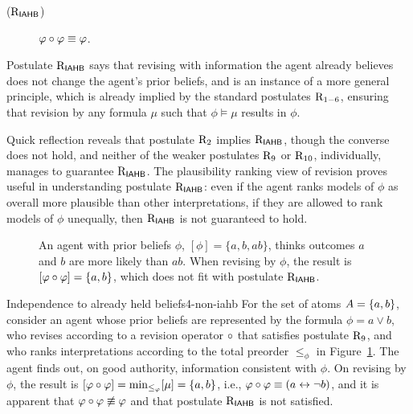 \begin{description}
	\item[($\mathrm{R}_{\mathsf{IAHB}}$)] $\varphi\circ\varphi\equiv\varphi$.
\end{description}

Postulate $\mathrm{R}_{\mathsf{IAHB}}$
says that revising with information the agent already believes
does not change the agent's prior beliefs,
and is an instance of a more general principle, 
which is already implied by the standard postulates $\mathrm{R}_{1-6}$,
ensuring that revision by any formula $\mu$ such that $\phi\models\mu$
results in $\phi$.

Quick reflection reveals that postulate $\mathrm{R}_{2}$ implies $\mathrm{R}_{\mathsf{IAHB}}$, 
though the converse does not hold,
and neither of the weaker postulates $\mathrm{R}_{9}$ or $\mathrm{R}_{10}$, individually,
manages to guarantee $\mathrm{R}_{\mathsf{IAHB}}$.
The plausibility ranking view of revision proves useful in understanding postulate $\mathrm{R}_{\mathsf{IAHB}}$:
even if the agent ranks models of $\phi$ as overall more plausible than other interpretations,
if they are allowed to rank models of $\phi$ unequally, then $\mathrm{R}_{\mathsf{IAHB}}$ is not guaranteed to hold.

\begin{figure}\centering
	\caption{
		An agent with prior beliefs $\phi$, $[\phi]=\{a,b,ab\}$, 
		thinks outcomes $a$ and $b$ are more likely than $ab$.
		When revising by $\phi$, the result is $[\varphi\circ\varphi]=\{a,b\}$,
		which does not fit with postulate $\mathrm{R}_{\mathsf{IAHB}}$.
	}
	\label{fig:4-non-stability}
\end{figure}

\begin{xmpl}{Independence to already held beliefs}{4-non-iahb}
	For the set of atoms $A=\{a,b\}$,
	consider an agent whose prior beliefs are represented by the formula $\phi=a\lor b$,
	who revises according to a revision operator $\circ$ that satisfies postulate $\mathrm{R}_{9}$,
	and who ranks interpretations according to the total preorder $\le_\phi$ in Figure~\ref{fig:4-non-stability}.
	The agent finds out, on good authority, information consistent with $\phi$.
	On revising by $\phi$, the result is $[\varphi\circ\varphi]={\operatorname{min}}_{\le_\varphi}[\mu] = \{a,b\}$,
	i.e., $\varphi\circ\varphi\equiv (a\leftrightarrow\lnot b)$,
	and it is apparent that $\varphi\circ\varphi\not\equiv\varphi$ 
	and that postulate $\mathrm{R}_{\mathsf{IAHB}}$ is not satisfied.
\end{xmpl}

